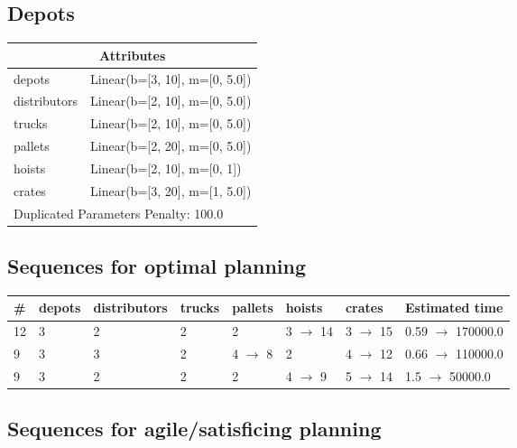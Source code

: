 \documentclass{article}
\begin{document}
                            \newpage \subsection{Depots}
                    \begin{center}
                    \begin{tabular}{@{}p{}p{}@{}}
                    \multicolumn{2}{c}{\bf \large Attributes}\\\midrule
                    depots & Linear(b=[3, 10], m=[0, 5.0])\\
distributors & Linear(b=[2, 10], m=[0, 5.0])\\
trucks & Linear(b=[2, 10], m=[0, 5.0])\\
pallets & Linear(b=[2, 20], m=[0, 5.0])\\
hoists & Linear(b=[2, 10], m=[0, 1])\\
crates & Linear(b=[3, 20], m=[1, 5.0]) \\\midrule
                    \multicolumn{2}{l}{Duplicated Parameters Penalty: 100.0}
                    \end{tabular}
                    \end{center}
                
                            \subsection*{Sequences for optimal planning}

                            \begin{center}
                            \begin{tabular}{@{}l|l|l|l|l|l|l|l@{}}
                            \# & depots & distributors & trucks & pallets & hoists & crates & Estimated time\\\midrule
                            12&3&2&2&2&3 $\rightarrow$ 14&3 $\rightarrow$ 15&0.59 $\rightarrow$ 170000.0\\
9&3&3&2&4 $\rightarrow$ 8&2&4 $\rightarrow$ 12&0.66 $\rightarrow$ 110000.0\\
9&3&2&2&2&4 $\rightarrow$ 9&5 $\rightarrow$ 14&1.5 $\rightarrow$ 50000.0
                            \end{tabular}
                            \end{center}
                    
                         \subsection*{Sequences for agile/satisficing planning}
\end{document}
